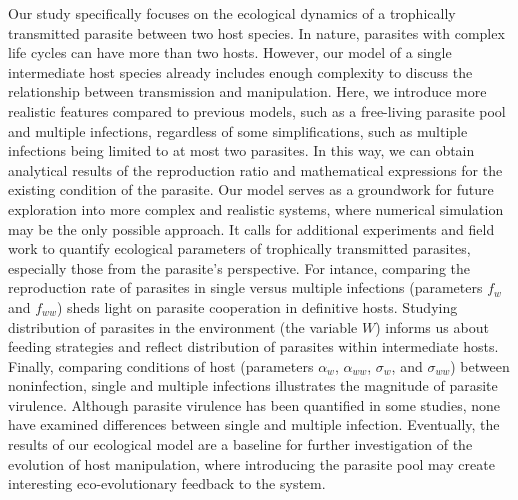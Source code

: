 \documentclass[a4paper]{scrartcl}
\begin{document}
Our study specifically focuses on the ecological dynamics of a trophically transmitted parasite between two host species. 
In nature, parasites with complex life cycles can have more than two hosts. 
However, our model of a single intermediate host species already includes enough complexity to discuss the relationship between transmission and manipulation.
Here, we introduce more realistic features compared to previous models, such as a free-living parasite pool and multiple infections, regardless of some simplifications, such as multiple infections being limited to at most two parasites. 
In this way, we can obtain analytical results of the reproduction ratio and mathematical expressions for the existing condition of the parasite.
Our model serves as a groundwork for future exploration into more complex and realistic systems, where numerical simulation may be the only possible approach.
It calls for additional experiments and field work to quantify ecological parameters of trophically transmitted parasites, especially those from the parasite's perspective. 
For intance, comparing the reproduction rate of parasites in single versus multiple infections (parameters $f_w$ and $f_{ww}$) sheds light on parasite cooperation in definitive hosts.
Studying distribution of parasites in the environment (the variable $W$) informs us about feeding strategies and reflect distribution of parasites within intermediate hosts.
Finally, comparing conditions of host (parameters $\alpha_w$, $\alpha_{ww}$, $\sigma_w$, and $\sigma_{ww}$) between noninfection, single and multiple infections illustrates the magnitude of parasite virulence. 
Although parasite virulence has been quantified in some studies, none have examined differences between single and multiple infection.
Eventually, the results of our ecological model are a baseline for further investigation of the evolution of host manipulation, where introducing the parasite pool may create interesting eco-evolutionary feedback to the system.






\end{document}
